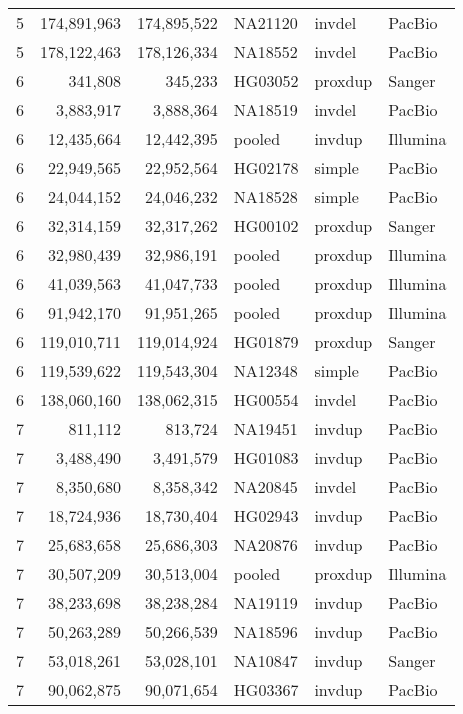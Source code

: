 {\begin{longtable}{rrrlll}
    5   & 174,891,963 & 174,895,522 & NA21120 & invdel  & PacBio  \\
    5   & 178,122,463 & 178,126,334 & NA18552 & invdel  & PacBio  \\
    6   & 341,808     & 345,233     & HG03052 & proxdup & Sanger  \\
    6   & 3,883,917   & 3,888,364   & NA18519 & invdel  & PacBio  \\
    6   & 12,435,664  & 12,442,395  & pooled  & invdup  & Illumina  \\
    6   & 22,949,565  & 22,952,564  & HG02178 & simple  & PacBio  \\
    6   & 24,044,152  & 24,046,232  & NA18528 & simple  & PacBio  \\
    6   & 32,314,159  & 32,317,262  & HG00102 & proxdup & Sanger  \\
    6   & 32,980,439  & 32,986,191  & pooled  & proxdup & Illumina  \\
    6   & 41,039,563  & 41,047,733  & pooled  & proxdup & Illumina  \\
    6   & 91,942,170  & 91,951,265  & pooled  & proxdup & Illumina  \\
    6   & 119,010,711 & 119,014,924 & HG01879 & proxdup & Sanger  \\
    6   & 119,539,622 & 119,543,304 & NA12348 & simple  & PacBio  \\
    6   & 138,060,160 & 138,062,315 & HG00554 & invdel  & PacBio  \\
    7   & 811,112     & 813,724     & NA19451 & invdup  & PacBio  \\
    7   & 3,488,490   & 3,491,579   & HG01083 & invdup  & PacBio  \\
    7   & 8,350,680   & 8,358,342   & NA20845 & invdel  & PacBio  \\
    7   & 18,724,936  & 18,730,404  & HG02943 & invdup  & PacBio  \\
    7   & 25,683,658  & 25,686,303  & NA20876 & invdup  & PacBio  \\
    7   & 30,507,209  & 30,513,004  & pooled  & proxdup & Illumina  \\
    7   & 38,233,698  & 38,238,284  & NA19119 & invdup  & PacBio  \\
    7   & 50,263,289  & 50,266,539  & NA18596 & invdup  & PacBio  \\
    7   & 53,018,261  & 53,028,101  & NA10847 & invdup  & Sanger  \\
    7   & 90,062,875  & 90,071,654  & HG03367 & invdup  & PacBio  \\

\end{longtable}}
